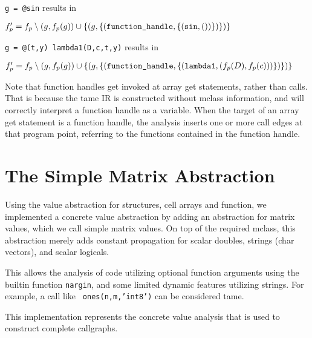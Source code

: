 
{\tt g = @sin} results in \hspace{.3cm}\\
\centerline{ $f_p' = f_p \setminus {(g,f_p(g))} \cup \{(g, \{(\text{\tt function\_handle},\{({\text {\tt sin}}, ())\})\})\} $}
{\tt g = @(t,y) lambda1(D,c,t,y)} results in\\
      \centerline{ $f_p' = f_p \setminus {(g,f_p(g))} \cup \{(g, \{(\text{\tt function\_handle},\{({\text {\tt lambda1}}, (f_p(D), f_p(c)))\}) \})\}$}

Note that function handles get invoked at array get statements, rather
than calls. That is because the tame IR is constructed without mclass
information, and will correctly interpret a function handle as a
variable. When the target of an array get statement is a function
handle, the analysis inserts one or more call edges at that program
point, referring to the functions contained in the function
handle.

\section{The Simple Matrix Abstraction}
\label{sec:simple}

Using the value abstraction for structures, cell arrays and function,
we implemented a concrete value abstraction by adding an abstraction
for matrix values, which we call simple matrix values. On top of the
required mclass, this abstraction merely adds constant propagation for
scalar doubles, strings (char vectors), and scalar logicals.

This allows the analysis of \matlab code utilizing optional function
arguments using the builtin function {\tt nargin}, and some limited
dynamic features utilizing strings. For example, a call like {\tt
ones(n,m,'int8')} can be considered tame.

This implementation represents the concrete value analysis that is
used to construct complete callgraphs.



